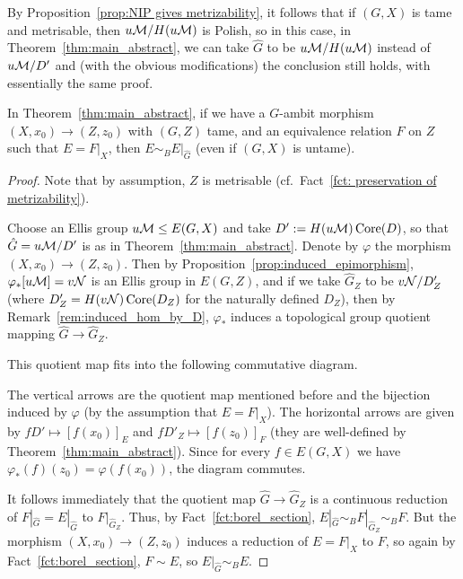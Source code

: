 	\begin{rem}
		By Proposition~\ref{prop:NIP gives metrizability}, it follows that if $(G,X)$ is tame and metrisable, then $u{\mathcal M}/H(u{\mathcal M})$ is Polish, so in this case, in Theorem~\ref{thm:main_abstract}, we can take $\hat G$ to be $u{\mathcal M}/H(u{\mathcal M})$ instead of $u{\mathcal M}/D'$ and (with the obvious modifications) the conclusion still holds, with essentially the same proof.
		\xqed{\lozenge}
	\end{rem}
	
	
	\begin{cor}
		\label{cor:tame_dominated}
		In Theorem~\ref{thm:main_abstract}, if we have a $G$-ambit morphism $(X,x_0)\to (Z,z_0)$ with $(G,Z)$ tame, and an equivalence relation $F$ on $Z$ such that $E=F|_X$, then $E\sim_B E|_{\hat G}$ (even if $(G,X)$ is untame).
	\end{cor}
	\begin{proof}
		Note that by assumption, $Z$ is metrisable (cf.\ Fact~\ref{fct: preservation of metrizability}).
		
		Choose an Ellis group $u{\mathcal M}\leq E(G,X)$ and take $D':=H(u{\mathcal M})\operatorname{{Core}}(D)$, so that $\hat G=u{\mathcal M}/D'$ is as in Theorem~\ref{thm:main_abstract}. Denote by $\varphi$ the morphism $(X,x_0)\to (Z,z_0)$. Then by Proposition~\ref{prop:induced_epimorphism}, $\varphi_*[u{\mathcal M}]=v{\mathcal N}$ is an Ellis group in $E(G,Z)$, and if we take $\hat G_Z$ to be $v{\mathcal N}/D'_Z$ (where $D'_Z=H(v{\mathcal N})\operatorname{{Core}}(D_Z)$ for the naturally defined $D_Z$), then by Remark~\ref{rem:induced_hom_by_D}, $\varphi_*$ induces a topological group quotient mapping $\hat G\to \hat G_Z$.
		
		This quotient map fits into the following commutative diagram.
		\begin{center}
		\end{center}
		The vertical arrows are the quotient map mentioned before and the bijection induced by $\varphi$ (by the assumption that $E=F|_X$). The horizontal arrows are given by $fD'\mapsto [f(x_0)]_E$ and $fD'_Z\mapsto [f(z_0)]_F$ (they are well-defined by Theorem~\ref{thm:main_abstract}). Since for every $f\in E(G,X)$ we have $\varphi_*(f)(z_0)=\varphi(f(x_0))$, the diagram commutes.
		
		It follows immediately that the quotient map $\hat G\to \hat G_Z$ is a continuous reduction of $F|_{\hat G}=E|_{\hat G}$ to $F|_{\hat G_Z}$. Thus, by Fact~\ref{fct:borel_section}, $E|_{\hat G}\sim_B F|_{\hat G_Z}\sim_B F$. But the morphism $(X,x_0)\to (Z,z_0)$ induces a reduction of $E=F|_X$ to $F$, so again by Fact~\ref{fct:borel_section}, $F\sim E$, so $E|_{\hat G}\sim_B E$.
	\end{proof}
	
